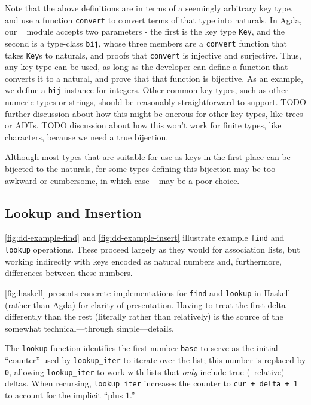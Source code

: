 
Note that the above definitions are in terms of a seemingly arbitrary key type,
and use a function \texttt{convert} to convert terms of that type into naturals.
In Agda, our \dd~ module accepts two parameters - the first is the key type \texttt{Key},
and the second is a type-class \texttt{bij}, whose three members are a \texttt{convert}
function that takes \texttt{Key}s to naturals, and proofs that \texttt{convert} is
injective and surjective. Thus, any key type can be used, as long as the developer
can define a function that converts it to a natural, and prove that that function is
bijective. As an example, we define a \texttt{bij} instance for integers. Other common
key types, such as other numeric types or strings, should be reasonably straightforward
to support. TODO further discussion about how this might be onerous for other key types,
like trees or ADTs. TODO discussion about how this won't work for finite types, like
characters, because we need a true bijection.

Although most types that are suitable for use as keys in the first place can be bijected to the
naturals, for some types defining this bijection may be too awkward or cumbersome, in which case \dds~ may
be a poor choice.

\subsection{Lookup and Insertion}
\label{sec:DD:basics}



\autoref{fig:dd-example-find} and \autoref{fig:dd-example-insert} illustrate example \texttt{find} and \texttt{lookup} operations.
%
These proceed largely as they would for association lists, but working indirectly with keys encoded as natural numbers and, furthermore, differences between these numbers.

\autoref{fig:haskell} presents concrete implementations for \texttt{find} and \texttt{lookup} in Haskell (rather than Agda) for clarity of presentation.
%
Having to treat the first delta differently than the rest (literally rather than relatively) is the source of the somewhat technical---through simple---details.

The \verb+lookup+ function identifies the first number \verb+base+ to serve as the initial ``counter'' used by \verb+lookup_iter+ to iterate over the list; this number is replaced by \verb+0+, allowing \verb+lookup_iter+ to work with lists that \emph{only} include true (\ie{}~relative) deltas.
%
When recursing, \verb+lookup_iter+ increases the counter to \texttt{cur + delta + 1} to account for the implicit ``plus $1$.''

